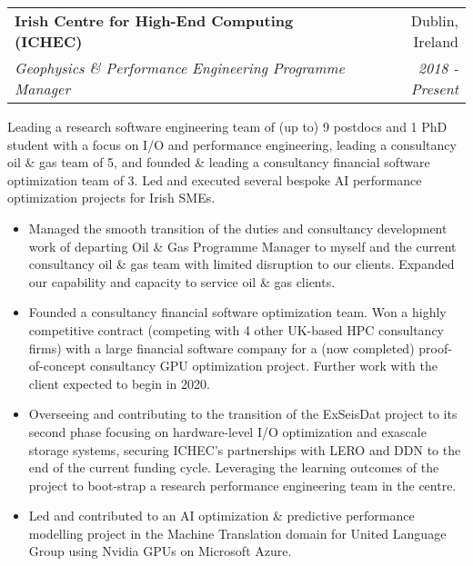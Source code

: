 \documentclass[11pt]{article}
\makeatletter
\newenvironment{resumeSubSectionHeader}{
    \par
    \begin{tabular*}{\textwidth}{l@{\extracolsep{\fill}}r}
    \par
} {
    \end{tabular*}
    \par
}
\newenvironment{resumeSubSectionBody}{
    \par
    \vspace{-0.4\parskip}
    \begin{small}
    \par
} {
    \par
    \end{small}
    \par
}
\newenvironment{resumeItemize}{
    \vspace{-0.5\baselineskip}
    \begin{itemize}
} {
    \end{itemize}
}
\makeatother
\begin{document}
\begin{resumeSubSectionHeader}

    \textbf{Irish Centre for High-End Computing (ICHEC)} & Dublin, Ireland \\
    \emph{Geophysics \& Performance Engineering Programme Manager} & \emph{2018 - Present}

\end{resumeSubSectionHeader}
\begin{resumeSubSectionBody}

    Leading a research software engineering team of (up to) 9 postdocs and 1 PhD
    student with a focus on I/O and performance engineering,
    leading a consultancy oil \& gas team of 5,
    and founded \& leading a consultancy financial software optimization team of
    3.
    Led and executed several bespoke AI performance optimization projects for
    Irish SMEs.

    \begin{resumeItemize}
        \item
            Managed the smooth transition of the duties and consultancy
            development work of departing Oil \& Gas Programme Manager to myself
            and the current consultancy oil \& gas team with limited disruption
            to our clients. Expanded our capability and capacity to service oil
            \& gas clients.

        \item
            Founded a consultancy financial software optimization team. Won a
            highly competitive contract (competing with 4 other UK-based HPC
            consultancy firms) with a large financial software company for a
            (now completed) proof-of-concept consultancy GPU optimization
            project.
            Further work with the client expected to begin in 2020.

        \item
            Overseeing and contributing to the transition of the ExSeisDat
            project to its second phase focusing on hardware-level I/O
            optimization and exascale storage systems, securing ICHEC's
            partnerships with LERO and DDN to the end of the current funding
            cycle.
            Leveraging the learning outcomes of the project to boot-strap a
            research performance engineering team in the centre.

        \item
            Led and contributed to an AI optimization \& predictive
            performance modelling project in the Machine Translation domain for
            United Language Group using Nvidia GPUs on Microsoft Azure.


\end{resumeItemize}
\end{resumeSubSectionBody}
\end{document}
